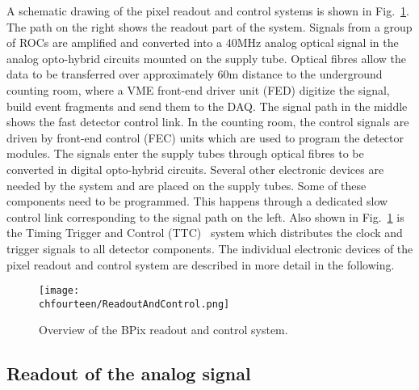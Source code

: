 A schematic drawing of the pixel readout and control systems is shown in Fig.~\ref{fig:BPixSystem}.
The path on the right shows the readout part of the system.
Signals from a group of ROCs are amplified and converted into a 40\unit{MHz} analog optical signal in the analog opto-hybrid circuits mounted on the supply tube.
Optical fibres allow the data to be transferred over approximately 60\unit{m} distance to the underground counting room, where a VME front-end driver unit (FED) digitize the signal, build event fragments and send them to the DAQ.
The signal path in the middle shows the fast detector control link.
In the counting room, the control signals are driven by front-end control (FEC) units which are used to program the detector modules.
The signals enter the supply tubes through optical fibres to be converted in digital opto-hybrid circuits.
Several other electronic devices are needed by the system and are placed on the supply tubes.
Some of these components need to be programmed. This happens through a dedicated slow control link corresponding to the signal path on the left.
Also shown in Fig.~\ref{fig:BPixSystem} is the Timing Trigger and Control (TTC)~\cite{Taylor:592719} system which distributes the clock and trigger signals to all detector components.
The individual electronic devices of the pixel readout and control system are described in more detail in the following.

\begin{figure}[!htb]
 \begin{center}
 \texttt{[image: \\chfourteen/ReadoutAndControl.png]}
 \end{center}
 \caption{Overview of the BPix readout and control system.}
 \label{fig:BPixSystem}
\end{figure}

\subsection{Readout of the analog signal}

